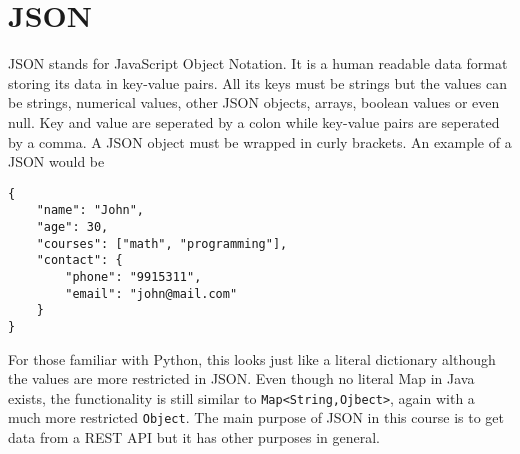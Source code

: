 \graphicspath{{./lab04/Images/}}


\maketocpage

\section{JSON}
JSON stands for JavaScript Object Notation. It is a human readable data format storing its data in key-value pairs. All its keys must be strings but the values can be strings, numerical values, other JSON objects, arrays, boolean values or even null. Key and value are seperated by a colon while key-value pairs are seperated by a comma. A JSON object must be wrapped in curly brackets. An example of a JSON would be
\begin{lstlisting}[style=A_JAVA]
{
	"name": "John",
	"age": 30,
	"courses": ["math", "programming"],
	"contact": {
		"phone": "9915311",
		"email": "john@mail.com"
	}
}
\end{lstlisting}
For those familiar with Python, this looks just like a literal dictionary although the values are more restricted in JSON. Even though no literal Map in Java exists, the functionality is still similar to \texttt{Map<String,Ojbect>}, again with a much more restricted \texttt{Object}. The main purpose of JSON in this course is to get data from a REST API but it has other purposes in general.

